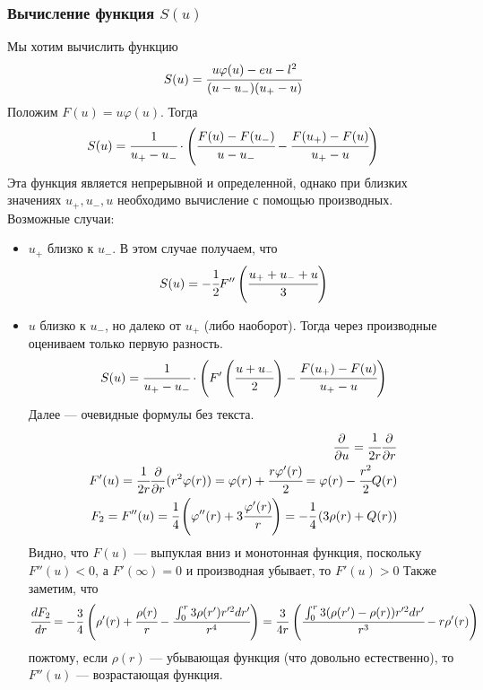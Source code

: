 \documentclass[a4paper, 14pt]{article}
\begin{document}
	\subsubsection{Вычисление функция $S(u)$}
	Мы хотим вычислить функцию 
	\begin{equation}
		S(u) = \cfrac{u\varphi(u) -eu-l^2}{(u-u_{-})(u_{+}-u)}
	\end{equation}
	Положим $F(u) = u\varphi(u)$.
	Тогда 
	\begin{equation}
		S(u) = \cfrac{1}{u_{+}-u_{-}}\cdot 
		\left(\cfrac{F(u)-F(u_{-})}{u-u_{-}} - \cfrac{F(u_{+})-F(u)}{u_{+}-u}\right)
	\end{equation}
	Эта функция является непрерывной и определенной, однако при близких значениях $u_{+}, u_{-}, u$ необходимо вычисление с помощью производных.
	Возможные случаи:
	\begin{itemize}
		\item $u_{+}$ близко к $u_{-}$. В этом случае получаем, что 
		\begin{equation}
			S(u) = -\cfrac{1}{2}F''\left(\cfrac{u_{+} + u_{-} + u}{3}\right)
		\end{equation}
		
		\item $u$ близко к $u_{-}$, но далеко от $u_{+}$ (либо наоборот). Тогда через производные оцениваем только первую разность.
		\begin{equation}
			S(u) = \cfrac{1}{u_{+}-u_{-}}\cdot 
			\left(F'\left(\cfrac{u+u_{-}}{2}\right) - \cfrac{F(u_{+})-F(u)}{u_{+}-u}\right)
		\end{equation}
		Далее --- очевидные формулы без текста.
		\begin{eqnarray}
			\frac{\partial }{\partial u} = \cfrac{1}{2r}\frac{\partial }{\partial r}\\
			F'(u) = \cfrac{1}{2r}\frac{\partial }{\partial r}(r^2\varphi(r)) = 
			\varphi(r) + \cfrac{r\varphi'(r)}{2} = \varphi(r) -\cfrac{r^2}{2} Q(r) \\
			F_2 = F''(u) = \cfrac{1}{4}
			\left( \varphi''(r) + 3\cfrac{\varphi'(r)}{r}\right) = -\cfrac{1}{4}\left(3\rho(r) + Q(r)\right)
		\end{eqnarray}
		Видно, что $F(u)$ --- выпуклая вниз и монотонная функция, поскольку $F''(u) < 0$, а $F'(\infty) = 0$ и производная убывает, то $F'(u) > 0$
		Также заметим, что
		\begin{equation*}
			\cfrac{dF_2}{dr} = -\frac{3}{4}\left(
			\rho'(r) + \cfrac{\rho(r)}{r} - \cfrac{\int_0^r{3\rho(r')r'^2dr'}}{r^4}
			\right) = 
			\frac{3}{4r}\left(
				\cfrac{\int_0^r{3(\rho(r')- \rho(r))r'^2dr'}}{r^3}
				- r\rho'(r)
			\right)
		\end{equation*}
		пожтому, если $\rho(r)$ --- убывающая функция (что довольно естественно), то $F''(u)$ --- возрастающая функция.
	\end{itemize}
	
\end{document}
